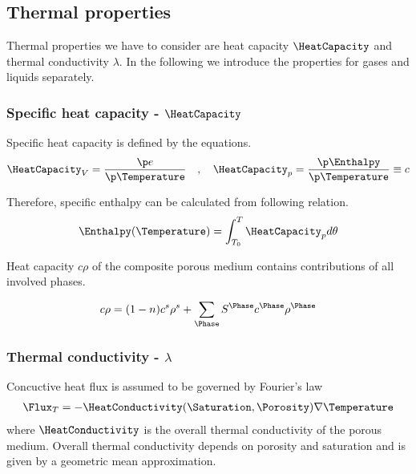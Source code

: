 \subsection{Thermal properties}
\label{sec:t_properties}

Thermal properties we have to consider are heat capacity $\HeatCapacity$ and thermal conductivity $\lambda$.
In the following we introduce the properties for gases and liquids separately.

\subsubsection{Specific heat capacity - $\HeatCapacity$}

Specific heat capacity is defined by the equations.
%
\begin{eqnarray}
\HeatCapacity_V
=
\frac{\p e}{\p\Temperature}
\quad , \quad
\HeatCapacity_p
=
\frac{\p\Enthalpy}{\p\Temperature}
\equiv
c
\end{eqnarray}

Therefore, specific enthalpy can be calculated from following relation.
%
\begin{eqnarray}
\Enthalpy(\Temperature)
=
\int_{T_0}^{T}
\HeatCapacity_p
d\theta
\end{eqnarray}

Heat capacity $c\rho$ of the composite porous medium
contains contributions of all involved phases.

\begin{eqnarray}
c\rho
=
(1-n)c^s\rho^s
+
\sum_\Phase S^\Phase c^\Phase \rho^\Phase
\label{eqn:heat_capacity}
\end{eqnarray}

\subsubsection{Thermal conductivity - $\lambda$}

Concuctive heat flux is assumed to be governed by Fourier's law
%
\begin{eqnarray}
\Flux_T
=
- 
\HeatConductivity(\Saturation,\Porosity)
\nabla\Temperature
\end{eqnarray}
%
where $\HeatConductivity$ is the overall thermal conductivity of the porous medium. Overall thermal conductivity depends on porosity and saturation and is given by a geometric mean approximation.
%

